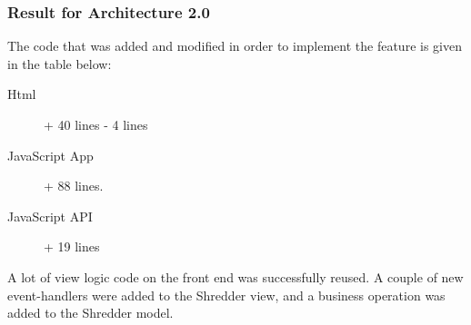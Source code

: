 
\subsubsection{Result for Architecture 2.0}
%

The code that was added and modified in order to implement the feature is given in the table below:
\begin{description}
  \item[Html] + 40 lines - 4 lines
  \item[JavaScript App] + 88 lines. 
  \item[JavaScript API] + 19 lines
\end{description}

A lot of view logic code on the front end was successfully reused. A couple of new event-handlers were added to the Shredder view, and a business operation was added to the Shredder model.

